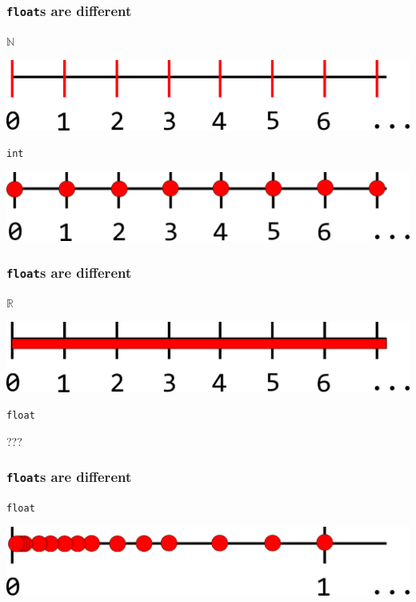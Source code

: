 \documentclass[aspectratio=43]{beamer}
\begin{document}
\begin{frame}
  \frametitle{\texttt{float}s are different}
  
  $\mathbb{N}$
  
  \begin{center}
  \includegraphics[height=.2\textheight]{resources/int_numbers.png}
  \end{center}
  
  \pause
  
  \texttt{int}

  \begin{center}
  \includegraphics[height=.2\textheight]{resources/int_numbers_sampled.png}
  \end{center}
\end{frame}

\begin{frame}
  \frametitle{\texttt{float}s are different}
  
  $\mathbb{R}$
  
  \begin{center}
  \includegraphics[height=.2\textheight]{resources/real_numbers.png}
  \end{center}
  
  \pause
  
  \texttt{float}

  \begin{center}
  ???
  \end{center}
\end{frame}


\begin{frame}
  \frametitle{\texttt{float}s are different}
  \texttt{float}

  \begin{center}
  \includegraphics[height=.2\textheight]{resources/real_numbers_sampled.png}
  \end{center}
\end{frame}
\end{document}

